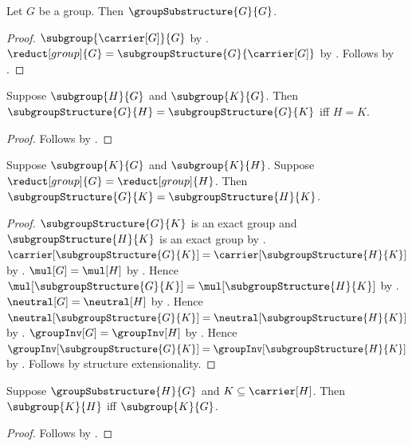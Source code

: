 \begin{theorem}\label{group_substructure_reflexive}
    Let $G$ be a group.
    Then $\groupSubstructure{G}{G}$.
\end{theorem}
\begin{proof}
    $\subgroup{\carrier[G]}{G}$ by
        .
    $\reduct[group]{G}
        =\subgroupStructure{G}{\carrier[G]}$ by
        .
    Follows by .
\end{proof}

\begin{theorem}\label{subgroup_structure_eq_iff_carrier_eq}
    Suppose $\subgroup{H}{G}$ and $\subgroup{K}{G}$.
    Then
        $\subgroupStructure{G}{H}=\subgroupStructure{G}{K}$ iff
        $H=K$.
\end{theorem}
\begin{proof}
    Follows by .
\end{proof}

\begin{theorem}\label{subgroup_structure_group_reduct_congruence}
    Suppose $\subgroup{K}{G}$ and $\subgroup{K}{H}$.
    Suppose $\reduct[group]{G}=\reduct[group]{H}$.
    Then
        $\subgroupStructure{G}{K}=\subgroupStructure{H}{K}$.
\end{theorem}
\begin{proof}
    $\subgroupStructure{G}{K}$ is an exact group and
        $\subgroupStructure{H}{K}$ is an exact group by
        .
    $\carrier[\subgroupStructure{G}{K}]
        =\carrier[\subgroupStructure{H}{K}]$ by
        .
    $\mul[G]=\mul[H]$ by
        .
    Hence
        $\mul[\subgroupStructure{G}{K}]
            =\mul[\subgroupStructure{H}{K}]$ by
        .
    $\neutral[G]=\neutral[H]$ by
        .
    Hence
        $\neutral[\subgroupStructure{G}{K}]
            =\neutral[\subgroupStructure{H}{K}]$ by
        .
    $\groupInv[G]=\groupInv[H]$ by
        .
    Hence
        $\groupInv[\subgroupStructure{G}{K}]
            =\groupInv[\subgroupStructure{H}{K}]$ by
        .
    Follows by structure extensionality.
\end{proof}

\begin{theorem}\label{subgroup_transfer_across_group_substructure}
    Suppose $\groupSubstructure{H}{G}$ and
        $K\subseteq\carrier[H]$.
    Then $\subgroup{K}{H}$ iff $\subgroup{K}{G}$.
\end{theorem}
\begin{proof}
    Follows by
        .
\end{proof}

